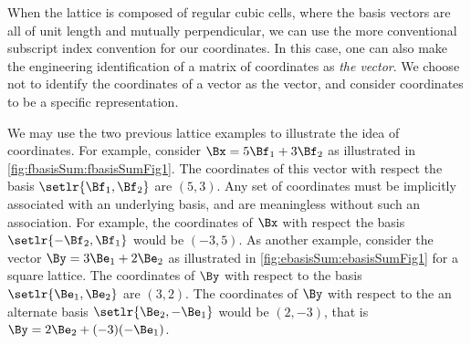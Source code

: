 When the lattice is composed of regular cubic cells, where the basis vectors are all of unit length and mutually perpendicular, we can use the more conventional subscript index convention for our coordinates.  In this case, one can also make the engineering identification of a matrix of coordinates as \emph{the vector}.
We choose not to identify the coordinates of a vector as the vector, and consider coordinates to be a specific representation.

We may use the two previous lattice examples to illustrate the idea of coordinates.
For example, consider
\( \Bx = 5 \Bf_1 + 3 \Bf_2 \) as illustrated in
\cref{fig:fbasisSum:fbasisSumFig1}.
The coordinates of this vector with respect the basis \(\setlr{\Bf_1, \Bf_2}\) are \((5,3)\).
Any set of coordinates must be implicitly associated with an underlying basis, and are meaningless without such an association.
For example, the
coordinates of \(\Bx\) with respect the basis \(\setlr{-\Bf_2, \Bf_1}\) would be \((-3,5)\).
As another example, consider the vector \( \By = 3 \Be_1 + 2 \Be_2 \) as illustrated in
\cref{fig:ebasisSum:ebasisSumFig1} for a square lattice.
The coordinates of \( \By \) with respect to the basis \( \setlr{\Be_1, \Be_2}\) are \((3,2)\).
The coordinates of \( \By \) with respect to the an alternate basis \( \setlr{\Be_2, -\Be_1}\) would be \((2,-3)\), that is
\(\By = 2 \Be_2 + (-3)(-\Be_1)\).

